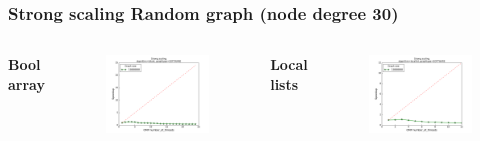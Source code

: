 \begin{frame}
\frametitle{Strong scaling Random graph (node degree 30)}
\begin{columns}[T]
  \bfseries{Bool array}
  \begin{figure}[!ht]
    \begin{center}
      \includegraphics[width=\textwidth]{img/strongscaling_bitset_gtSOFTWARE_opt1.pdf}
    \end{center}
  \end{figure}

  \bfseries{Local lists}
  \begin{figure}[!ht]
    \begin{center}
      \includegraphics[width=\textwidth]{img/strongscaling_locallist_gtSOFTWARE_opt0.pdf}
    \end{center}
  \end{figure}
\end{columns}

\end{frame}

